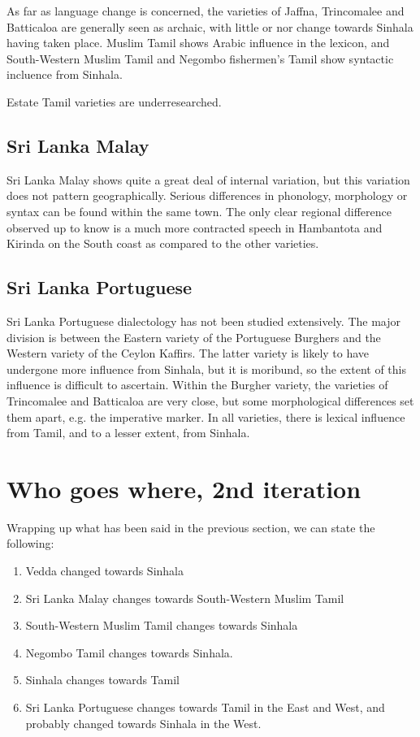 \documentclass[handout,utf8]{article}
\begin{document}
As far as language change is concerned, the varieties of Jaffna, Trincomalee and Batticaloa are generally seen as archaic, with little or nor change towards Sinhala having taken place. Muslim Tamil shows Arabic influence in the lexicon, and South-Western Muslim Tamil and Negombo fishermen's Tamil show syntactic incluence from Sinhala. 

Estate Tamil varieties are underresearched.


\subsection{Sri Lanka Malay}
Sri Lanka Malay shows quite a great deal of internal variation, but this variation does not pattern geographically. Serious differences in phonology, morphology or syntax can be found within the same town. The only clear regional difference observed up to know is a much more contracted speech in Hambantota and Kirinda on the South coast as compared to the other varieties. 



\subsection{Sri Lanka Portuguese}
Sri Lanka Portuguese dialectology has not been studied extensively. The major division is between the Eastern variety of the Portuguese Burghers and the Western variety of the Ceylon Kaffirs. The latter variety is likely to have undergone more influence from Sinhala, but it is moribund, so the extent of this influence is difficult to ascertain. Within the Burgher variety, the varieties of Trincomalee and Batticaloa are very close, but some morphological differences set them apart, e.g. the imperative marker. In all varieties, there is lexical influence from Tamil, and to a lesser extent, from Sinhala. 

\section{Who goes where, 2nd iteration}
Wrapping up what has been said in the previous section, we can state the following:

\begin{enumerate}
 \item Vedda changed towards Sinhala
 \item Sri Lanka Malay changes towards South-Western Muslim Tamil 
 \item South-Western Muslim Tamil changes towards Sinhala
 \item Negombo Tamil changes towards Sinhala. 
 \item Sinhala changes towards Tamil 
 \item Sri Lanka Portuguese changes towards Tamil in the East and West, and probably changed towards Sinhala in the West.
\end{enumerate}
\end{document}
